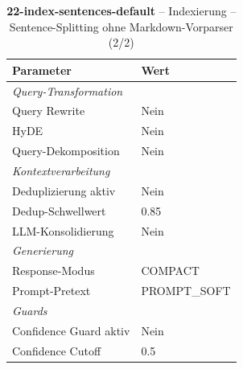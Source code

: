 \begin{table}[H]
\centering
\small
\setlength{\tabcolsep}{4pt}
\begin{tabular}{lp{8cm}}
\toprule
\textbf{Parameter} & \textbf{Wert} \\
\midrule
\multicolumn{2}{l}{\textit{Query-Transformation}} \\
\midrule
\quad Query Rewrite & Nein \\
\quad HyDE & Nein \\
\quad Query-Dekomposition & Nein \\
\midrule
\multicolumn{2}{l}{\textit{Kontextverarbeitung}} \\
\midrule
\quad Deduplizierung aktiv & Nein \\
\quad Dedup-Schwellwert & 0.85 \\
\quad LLM-Konsolidierung & Nein \\
\midrule
\multicolumn{2}{l}{\textit{Generierung}} \\
\midrule
\quad Response-Modus & COMPACT \\
\quad Prompt-Pretext & PROMPT\_SOFT \\
\midrule
\multicolumn{2}{l}{\textit{Guards}} \\
\midrule
\quad Confidence Guard aktiv & Nein \\
\quad Confidence Cutoff & 0.5 \\
\bottomrule
\end{tabular}
\caption{\textbf{22-index-sentences-default} -- Indexierung -- Sentence-Splitting ohne Markdown-Vorparser (2/2)}
\label{tab:config_22_index_sentences_default_b}
\end{table}